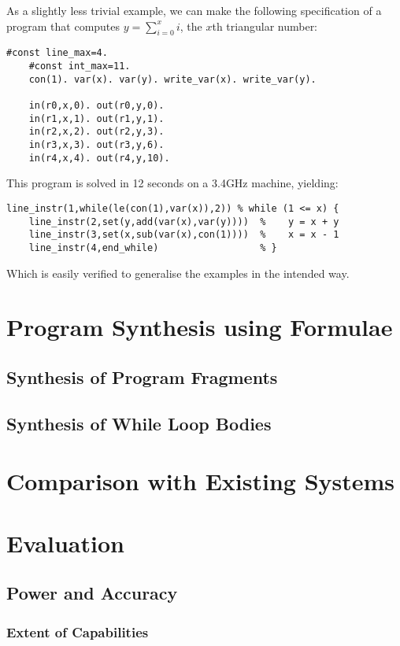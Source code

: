 \documentclass[a4paper,twoside,notitlepage]{article}
\begin{document}
As a slightly less trivial example, we can make the following 
specification of a program that computes $y = \sum_{i=0}^x i$, the $x$th 
triangular number:
\begin{Verbatim}[samepage=true]
    #const line_max=4.
    #const int_max=11. 
    con(1). var(x). var(y). write_var(x). write_var(y).
    
    in(r0,x,0). out(r0,y,0).
    in(r1,x,1). out(r1,y,1).
    in(r2,x,2). out(r2,y,3).
    in(r3,x,3). out(r3,y,6).
    in(r4,x,4). out(r4,y,10).
\end{Verbatim}
This program is solved in 12 seconds on a 3.4GHz machine, yielding:
\begin{Verbatim}[samepage=true]
    line_instr(1,while(le(con(1),var(x)),2)) % while (1 <= x) {
    line_instr(2,set(y,add(var(x),var(y))))  %    y = x + y
    line_instr(3,set(x,sub(var(x),con(1))))  %    x = x - 1
    line_instr(4,end_while)                  % }
\end{Verbatim}
Which is easily verified to generalise the examples in the intended way.

\clearpage

\section{Program Synthesis using Formulae} \label{sec:synfrm}
\subsection{Synthesis of Program Fragments}
\subsection{Synthesis of While Loop Bodies}

\section{Comparison with Existing Systems}

\section{Evaluation}
\subsection{Power and Accuracy}
\subsubsection{Extent of Capabilities}
\end{document}
